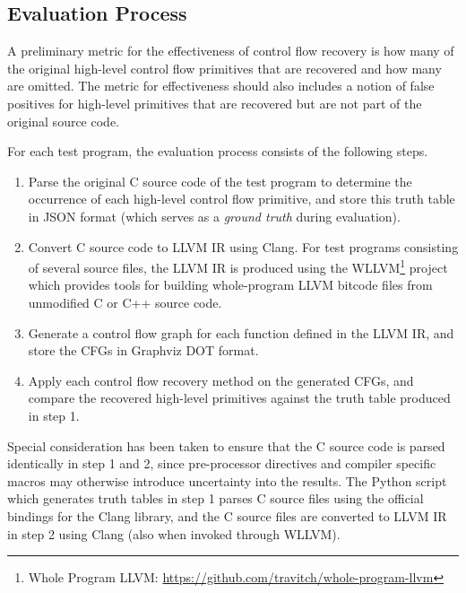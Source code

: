 
\subsection{Evaluation Process}
\label{sec:evaluation_process}


A preliminary metric for the effectiveness of control flow recovery is how many of the original high-level control flow primitives that are recovered and how many are omitted. The metric for effectiveness should also includes a notion of false positives for high-level primitives that are recovered but are not part of the original source code.

For each test program, the evaluation process consists of the following steps.

\begin{enumerate}
	\item \label{itm:step_c_to_json} Parse the original C source code of the test program to determine the occurrence of each high-level control flow primitive, and store this truth table in JSON format (which serves as a \textit{ground truth} during evaluation).
	\item \label{itm:step_c_to_ll} Convert C source code to LLVM IR using Clang. For test programs consisting of several source files, the LLVM IR is produced using the WLLVM\footnote{Whole Program LLVM: \url{https://github.com/travitch/whole-program-llvm}} project which provides tools for building whole-program LLVM bitcode files from unmodified C or C++ source code.
	\item \label{itm:step_ll_to_dot} Generate a control flow graph for each function defined in the LLVM IR, and store the CFGs in Graphviz DOT format.
	\item \label{itm:step_dot_to_json} Apply each control flow recovery method on the generated CFGs, and compare the recovered high-level primitives against the truth table produced in step 1.
\end{enumerate}

Special consideration has been taken to ensure that the C source code is parsed identically in step 1 and 2, since pre-processor directives and compiler specific macros may otherwise introduce uncertainty into the results. The Python script which generates truth tables in step 1 parses C source files using the official bindings for the Clang library, and the C source files are converted to LLVM IR in step 2 using Clang (also when invoked through WLLVM).
